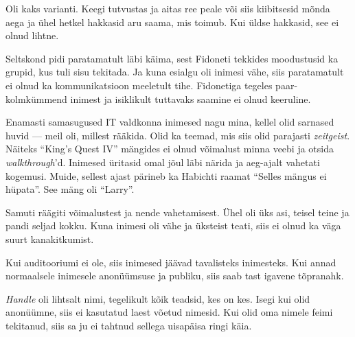 
Oli kaks varianti. Keegi tutvustas ja aitas ree peale või siis kiibitsesid mõnda 
aega ja ühel hetkel hakkasid aru saama, mis toimub. Kui üldse hakkasid, see ei olnud lihtne.


Seltskond pidi paratamatult läbi käima, sest Fidoneti tekkides moodustusid ka grupid, kus tuli sisu 
tekitada. Ja kuna esialgu oli inimesi vähe, siis paratamatult ei olnud ka
kommunikatsioon meeletult tihe. Fidonetiga tegeles 
paar-kolmkümmend inimest ja isiklikult tuttavaks saamine ei olnud keeruline.


Enamasti samasugused IT valdkonna inimesed nagu mina, kellel olid
sarnased huvid --- meil oli, millest rääkida. Olid ka 
teemad, mis siis olid parajasti \emph{zeitgeist}. 
Näiteks \enquote{King's Quest 
IV} mängides ei olnud võimalust minna 
veebi ja otsida \emph{walkthrough}'d. Inimesed üritasid omal jõul 
läbi närida ja aeg-ajalt vahetati kogemusi. Muide, sellest ajast pärineb 
ka Habichti raamat \enquote{Selles mängus ei hüpata}. 
See mäng oli 
\enquote{Larry}.

Samuti räägiti võimalustest ja nende 
vahetamisest. Ühel oli üks asi, teisel teine ja pandi seljad kokku. Kuna 
inimesi oli vähe ja üksteist teati, siis ei olnud ka väga 
suurt kanakitkumist.


Kui auditooriumi ei ole, siis inimesed jäävad tavalisteks inimesteks. Kui 
annad normaalsele inimesele anonüümsuse ja publiku, siis saab tast igavene 
tõpranahk.


\emph{Handle} oli lihtsalt nimi, tegelikult kõik teadsid, kes on kes. 
Isegi kui olid anonüümne, siis ei 
kasutatud laest võetud nimesid. Kui olid oma nimele
feimi tekitanud, siis sa ju ei tahtnud sellega 
uisapäisa ringi käia.


